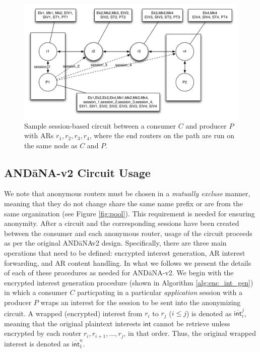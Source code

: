 \begin{figure}[ht!]
\begin{center}
\includegraphics[scale=0.5]{./images/circuit.pdf}
\end{center}
\caption{Sample session-based circuit between a consumer $C$ and producer $P$ with ARs $r_1,r_2,r_3,r_4$, where the end routers on the path are run on the same node as $C$ and $P$.}
\label{fig:circuit}
\end{figure}

\subsection{{\sf AND\=aNA-v2} Circuit Usage}

We note that anonymous routers must be chosen in a \emph{mutually excluse} manner, meaning that they do not change share the same name prefix or are from the same organization (see Figure \ref{fig:pool}). This requirement is needed for ensuring anonymity. After a circuit and the corresponding sessions have been created between the consumer and each anonymous router, usage of the circuit proceeds as per the original {\sf AND\=aNAv2} design. Specifically, there are three main operations that need to be defined: encrypted interest generation, AR interest forwarding, and AR content handling. In what we follows we present the details of each of these procedures as needed for {\sf AND\=aNA-v2}. We begin with the encrypted interest generation procedure (shown in Algorithm \ref{alg:enc_int_gen}) in which a consumer $C$ particpating in a particular \emph{application} session with a producer $P$ wraps an interest for the session to be sent into the anonymizing circuit. A wrapped (encrypted) interest from $r_i$ to $r_j$ ($i \leq j$) is denoted as $\overline{\mathsf{int}}_i^j$, meaning that the original plaintext interests $\mathsf{int}$ cannot be retrieve unless encrypted by each router $r_i,r_{i+1},\dots,r_j$, in that order. Thus, the original wrapped interest is denoted as $\overline{\mathsf{int}}_1^n$.

